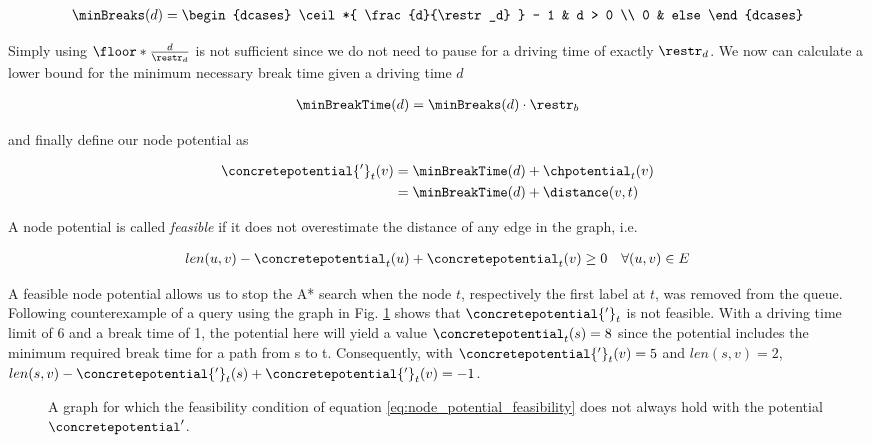 \begin{align}\label{eq:min_breaks}
	\minBreaks(d) = \begin{dcases}
		\ceil*{ \frac{d}{\restr_d} } - 1 & d > 0 \\
		0                                & else
	\end{dcases}
\end{align}

Simply using $\floor*{ \frac{d}{\restr_d} }$ is not sufficient since we do not need to pause for a driving time of exactly $\restr_d$. We now can calculate a lower bound for the minimum necessary break time given a driving time $d$

\begin{align}\label{eq:min_break_time}
	\minBreakTime(d) = \minBreaks(d) \cdot \restr_b
\end{align}

and finally define our node potential as

\begin{align}
	\begin{split}
		\concretepotential{'}_t(v) & = \minBreakTime(d) + \chpotential_t(v) \\
		& = \minBreakTime(d) + \distance(v,t)
	\end{split}
\end{align}

A node potential is called \emph{feasible} if it does not overestimate the distance of any edge in the graph, i.e.

\begin{align}
	\label{eq:node_potential_feasibility}
	len(u,v) - \concretepotential_t(u) + \concretepotential_t(v) \ge 0 \quad \forall (u,v) \in E
\end{align}

A feasible node potential allows us to stop the A* search when the node $t$, respectively the first label at $t$, was removed from the queue. Following counterexample of a query using the graph in Fig. \ref{fig:graph_infeasible_potential} shows that $\concretepotential{'}_t$ is not feasible. With a driving time limit of 6 and a break time of 1, the potential here will yield a value $\concretepotential_t(s) = 8$ since the potential includes the minimum required break time for a path from s to t. Consequently, with $\concretepotential{'}_t(v) = 5$ and $len(s,v) = 2$, $len(s,v) - \concretepotential{'}_t(s) + \concretepotential{'}_t(v) = -1$.

\begin{figure}[hbtp]
	\centering
	
	\caption{A graph for which the feasibility condition of equation \ref{eq:node_potential_feasibility} does not always hold with the potential $\concretepotential'$.}
	\label{fig:graph_infeasible_potential}
\end{figure}

